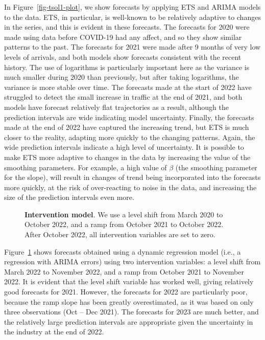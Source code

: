 \documentclass[11pt,a4paper,]{article}
\begin{document}
In Figure~\ref{fig-tsol1-plot}, we show forecasts by applying ETS and
ARIMA models to the data. ETS, in particular, is well-known to be
relatively adaptive to changes in the series, and this is evident in
these forecasts. The forecasts for 2020 were made using data before
COVID-19 had any affect, and so they show similar patterns to the past.
The forecasts for 2021 were made after 9 months of very low levels of
arrivals, and both models show forecasts consistent with the recent
history. The use of logarithms is particularly important here as the
variance is much smaller during 2020 than previously, but after taking
logarithms, the variance is more stable over time. The forecasts made at
the start of 2022 have struggled to detect the small increase in traffic
at the end of 2021, and both models have forecast relatively flat
trajectories as a result, although the prediction intervals are wide
indicating model uncertainty. Finally, the forecasts made at the end of
2022 have captured the increasing trend, but ETS is much closer to the
reality, adapting more quickly to the changing patterns. Again, the wide
prediction intervals indicate a high level of uncertainty. It is
possible to make ETS more adaptive to changes in the data by increasing
the value of the smoothing parameters. For example, a high value of
\(\beta\) (the smoothing parameter for the slope), will result in
changes of trend being incorporated into the forecasts more quickly, at
the risk of over-reacting to noise in the data, and increasing the size
of the prediction intervals even more.

\begin{figure}[!b]


\caption{\label{fig-tsol2-plot}\textbf{Intervention model}. We use a
level shift from March 2020 to October 2022, and a ramp from October
2021 to October 2022. After October 2022, all intervention variables are
set to zero.}

\end{figure}%

Figure~\ref{fig-tsol2-plot} shows forecasts obtained using a dynamic
regression model (i.e., a regression with ARIMA errors) using two
intervention variables: a level shift from March 2022 to November 2022,
and a ramp from October 2021 to November 2022. It is evident that the
level shift variable has worked well, giving relatively good forecasts
for 2021. However, the forecasts for 2022 are particularly poor, because
the ramp slope has been greatly overestimated, as it was based on only
three observations (Oct -- Dec 2021). The forecasts for 2023 are much
better, and the relatively large prediction intervals are appropriate
given the uncertainty in the industry at the end of 2022.
\end{document}
